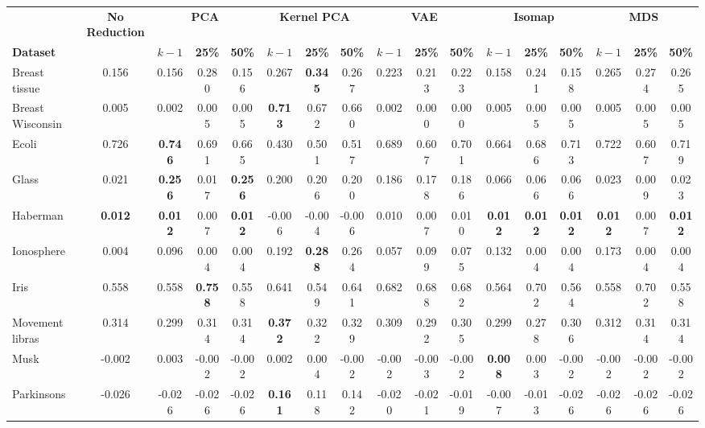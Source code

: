 \begin{tabular}{lcccccccccccccccc}
\toprule
 & \textbf{No Reduction} & \multicolumn{3}{c}{\textbf{PCA}} & \multicolumn{3}{c}{\textbf{Kernel PCA}} & \multicolumn{3}{c}{\textbf{VAE}} & \multicolumn{3}{c}{\textbf{Isomap}} & \multicolumn{3}{c}{\textbf{MDS}} \\
\cmidrule(lr){3-5} \cmidrule(lr){6-8} \cmidrule(lr){9-11} \cmidrule(lr){12-14} \cmidrule(lr){15-17}
\textbf{Dataset} &  & \textbf{$k-1$} & \textbf{25\%} & \textbf{50\%} & \textbf{$k-1$} & \textbf{25\%} & \textbf{50\%} & \textbf{$k-1$} & \textbf{25\%} & \textbf{50\%} & \textbf{$k-1$} & \textbf{25\%} & \textbf{50\%} & \textbf{$k-1$} & \textbf{25\%} & \textbf{50\%} \\
\midrule
Breast tissue & 0.156 & 0.156 & 0.280 & 0.156 & 0.267 & \textbf{0.345} & 0.267 & 0.223 & 0.213 & 0.223 & 0.158 & 0.241 & 0.158 & 0.265 & 0.274 & 0.265 \\
Breast Wisconsin & 0.005 & 0.002 & 0.005 & 0.005 & \textbf{0.713} & 0.672 & 0.660 & 0.002 & 0.000 & 0.000 & 0.005 & 0.005 & 0.005 & 0.005 & 0.005 & 0.005 \\
Ecoli & 0.726 & \textbf{0.746} & 0.691 & 0.665 & 0.430 & 0.501 & 0.517 & 0.689 & 0.607 & 0.701 & 0.664 & 0.686 & 0.713 & 0.722 & 0.607 & 0.719 \\
Glass & 0.021 & \textbf{0.256} & 0.017 & \textbf{0.256} & 0.200 & 0.206 & 0.200 & 0.186 & 0.178 & 0.186 & 0.066 & 0.066 & 0.066 & 0.023 & 0.009 & 0.023 \\
Haberman & \textbf{0.012} & \textbf{0.012} & 0.007 & \textbf{0.012} & -0.006 & -0.004 & -0.006 & 0.010 & 0.007 & 0.010 & \textbf{0.012} & \textbf{0.012} & \textbf{0.012} & \textbf{0.012} & 0.007 & \textbf{0.012} \\
Ionosphere & 0.004 & 0.096 & 0.004 & 0.004 & 0.192 & \textbf{0.288} & 0.264 & 0.057 & 0.099 & 0.075 & 0.132 & 0.004 & 0.004 & 0.173 & 0.004 & 0.004 \\
Iris & 0.558 & 0.558 & \textbf{0.758} & 0.558 & 0.641 & 0.549 & 0.641 & 0.682 & 0.688 & 0.682 & 0.564 & 0.702 & 0.564 & 0.558 & 0.702 & 0.558 \\
Movement libras & 0.314 & 0.299 & 0.314 & 0.314 & \textbf{0.372} & 0.322 & 0.329 & 0.309 & 0.292 & 0.305 & 0.299 & 0.278 & 0.306 & 0.312 & 0.314 & 0.314 \\
Musk & -0.002 & 0.003 & -0.002 & -0.002 & 0.002 & 0.004 & -0.002 & -0.002 & -0.003 & -0.002 & \textbf{0.008} & 0.003 & -0.002 & -0.002 & -0.002 & -0.002 \\
Parkinsons & -0.026 & -0.026 & -0.026 & -0.026 & \textbf{0.161} & 0.118 & 0.142 & -0.020 & -0.021 & -0.019 & -0.007 & -0.013 & -0.026 & -0.026 & -0.026 & -0.026 \\

\end{tabular}
